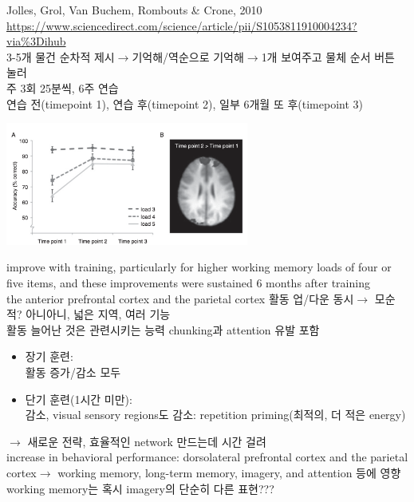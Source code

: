 \documentclass[../note.tex]{subfiles}
\begin{document}
\begin{note}{Jolles, Grol, Van Buchem, Rombouts & Crone, 2010}
  \url{https://www.sciencedirect.com/science/article/pii/S1053811910004234?via%3Dihub}\\
  3-5개 물건 순차적 제시$\rightarrow$기억해/역순으로 기억해$\rightarrow$1개 보여주고 물체 순서 버튼 눌러\\
  주 3회 25분씩, 6주 연습\\
  연습 전(timepoint 1), 연습 후(timepoint 2), 일부 6개월 또 후(timepoint 3)\\

  \begin{center}
    \includegraphics[width=0.6\textwidth]{image/ch6_plasticity}
  \end{center}
  improve with training, particularly for higher working
memory loads of four or five items, and these improvements were
sustained 6 months after training\\
  the anterior prefrontal cortex
  and the parietal cortex 활동 업/다운 동시$\rightarrow$ 모순적? 아니아니, 넓은 지역, 여러 기능\\
  활동 늘어난 것은 관련시키는 능력 chunking과 attention 유발 포함
\end{note}

\begin{itemize}
  \item 장기 훈련:\\
    활동 증가/감소 모두
  \item 단기 훈련(1시간 미만):\\
    감소, visual sensory regions도 감소: repetition priming(최적의, 더 적은 energy)
\end{itemize}
$\rightarrow$ 새로운 전략, 효율적인 network 만드는데 시간 걸려\\

increase in behavioral performance:
dorsolateral prefrontal cortex and the parietal cortex$\rightarrow$ working memory, long-term memory, imagery, and attention 등에 영향\\
working memory는 혹시 imagery의 단순히 다른 표현???
\end{document}
